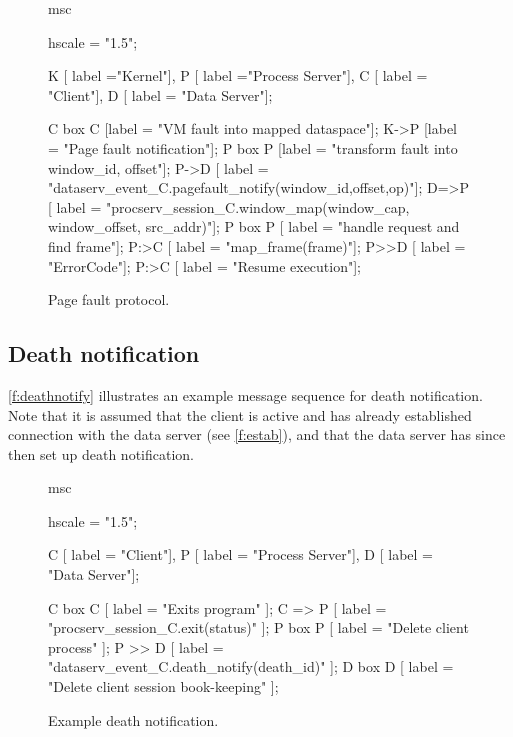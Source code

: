 \begin{figure}[h]
  \begin{center}
    \begin{msc}
      msc {
        hscale = "1.5";
        
        K [ label ="Kernel"],
        P [ label ="Process Server"],
        C [ label = "Client"],
        D [ label = "Data Server"];
       
        C box C [label = "VM fault into mapped dataspace"];
        K->P [label = "Page fault notification"];
        P box P [label = "transform fault into window\_id, offset"];
        P->D [ label = "dataserv\_event\_C.pagefault\_notify(window\_id,offset,op)"];
        D=>P [ label = "procserv\_session\_C.window\_map(window\_cap, window\_offset, src\_addr)"];
        P box P [ label = "handle request and find frame"];
        P:>C [ label = "map\_frame(frame)"];
        P>>D [ label = "ErrorCode"];
        P:>C [ label = "Resume execution"];
      }
    \end{msc}
  \end{center}
  \caption{Page fault protocol.}
  \label{f:pagefault}
\end{figure}

\clearpage
\subsection{Death notification}
\autoref{f:deathnotify} illustrates an example message sequence for death notification. Note that
it is assumed that the client is active and has already established connection with the data server
(see \autoref{f:estab}), and that the data server has since then set up death notification.

\begin{figure}[h]
\begin{center}
\begin{msc}
  msc {
    hscale = "1.5";

    C [ label = "Client"],
    P [ label = "Process Server"],
    D [ label = "Data Server"];
    
    C box C [ label = "Exits program" ];
    C => P [ label = "procserv\_session\_C.exit(status)" ];
    P box P [ label = "Delete client process" ];
    P >> D [ label = "dataserv\_event\_C.death\_notify(death\_id)" ];
    D box D [ label = "Delete client session book-keeping" ];
  }
\end{msc}
\end{center}
\caption{Example death notification.}
\label{f:deathnotify}
\end{figure}

